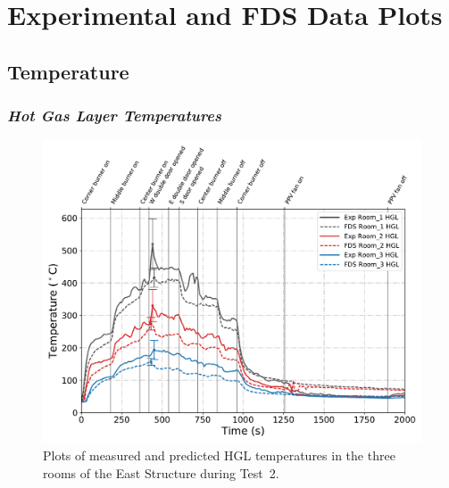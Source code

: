 \appendix
\renewcommand{\thechapter}{B}
\renewcommand{\chaptername}{Appendix}

\chapter{Experimental and FDS Data Plots}
\label{chap:exp_FDS_plots}

\section{Temperature}
\subsection*{\textit{Hot Gas Layer Temperatures}}
\begin{figure}[!h]
	\centering
	\includegraphics[width=\columnwidth]{Figures/Plots/Validation/Temperature/Test_2_HGL}
	\caption[Plots of measured and predicted HGL temperatures during Test~2.]{Plots of measured and predicted HGL temperatures in the three rooms of the East Structure during Test~2.}
	\label{fig:HGL_data_Test2}
\end{figure}

